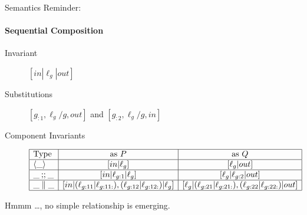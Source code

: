 Semantics Reminder:


\paragraph{Sequential Composition}

\begin{description}
  \item[Invariant]
    $[in|\ell_g|out]$
  \item[Substitutions]
    $[g_{:1},\ell_g/g,out]$ and $[g_{:2},\ell_g/g,in]$
  \item[Component Invariants]
    $$\begin{array}{|l|c|c|}
    \hline
      \mbox{Type} & \mbox{as }P & \mbox{as }Q
    \\\hline
      \langle\_\rangle & [in|\ell_g] & [\ell_g|out]
    \\\hline
       \_\mathbin{;\!;}\_& [in|\ell_{g:1}|\ell_g] & [\ell_g|\ell_{g:2}|out]
    \\\hline
       \_\parallel\_
       & [in|(\ell_{g:11}|\ell_{g:11:}),(\ell_{g:12}|\ell_{g:12:})|\ell_g]
       & [\ell_g|(\ell_{g:21}|\ell_{g:21:}),(\ell_{g:22}|\ell_{g:22:})|out]
    \\\hline
    \end{array}$$
\end{description}
Hmmm \dots, no simple relationship is emerging.
